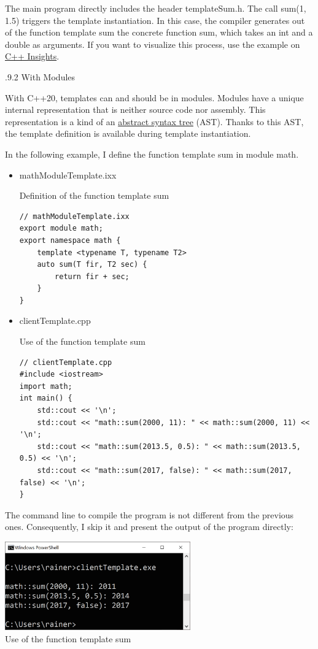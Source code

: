 The main program directly includes the header templateSum.h. The call sum(1, 1.5) triggers the template instantiation. In this case, the compiler generates out of the function template sum the concrete function sum, which takes an int and a double as arguments. If you want to visualize this process, use the example on \href{https://cppinsights.io/}{C++ Insights}.

.9.2\hspace{0.2cm} With Modules

With C++20, templates can and should be in modules. Modules have a unique internal representation that is neither source code nor assembly. This representation is a kind of an \href{https://en.wikipedia.org/wiki/Abstract_syntax_tree}{abstract syntax tree} (AST). Thanks to this AST, the template definition is available during template instantiation.

In the following example, I define the function template sum in module math.

\begin{itemize}
\item 
mathModuleTemplate.ixx

\noindent
Definition of the function template sum
\begin{lstlisting}[style=styleCXX]
// mathModuleTemplate.ixx
export module math;
export namespace math {
	template <typename T, typename T2>
	auto sum(T fir, T2 sec) {
		return fir + sec;
	}
}
\end{lstlisting}

\item 
clientTemplate.cpp

\noindent
Use of the function template sum
\begin{lstlisting}[style=styleCXX]
// clientTemplate.cpp
#include <iostream>
import math;
int main() {
	std::cout << '\n';
	std::cout << "math::sum(2000, 11): " << math::sum(2000, 11) << '\n';
	std::cout << "math::sum(2013.5, 0.5): " << math::sum(2013.5, 0.5) << '\n';
	std::cout << "math::sum(2017, false): " << math::sum(2017, false) << '\n';
}
\end{lstlisting}
\end{itemize}

The command line to compile the program is not different from the previous ones. Consequently, I skip it and present the output of the program directly:

\begin{center}
\includegraphics[width=0.6\textwidth]{content/3/chapter4/images/24.png}\\
Use of the function template sum
\end{center}

